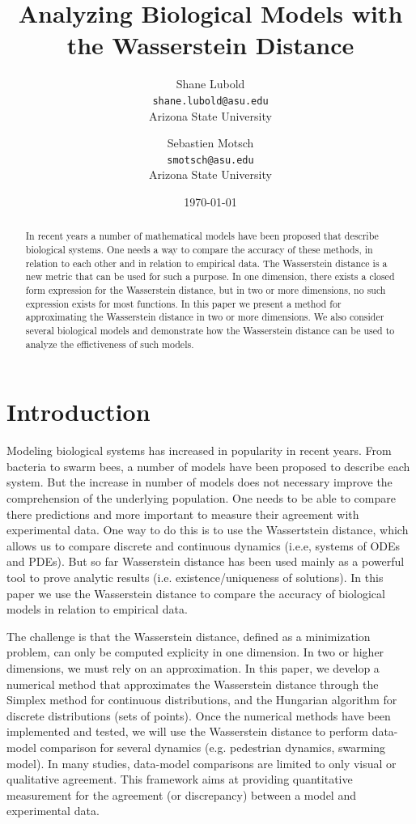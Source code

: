 \documentclass[10pt]{article}
\title{Analyzing Biological Models with the Wasserstein Distance}
\author{
  Shane Lubold\\
  \texttt{shane.lubold@asu.edu}\\
  Arizona State University
  \and
  Sebastien Motsch \\
  \texttt{smotsch@asu.edu}\\
  Arizona State University
}
\date{\today}
\begin{document}
\maketitle


\begin{abstract}
In recent years a number of mathematical models have been proposed that describe biological systems. One needs a way to compare the accuracy of these methods, in relation to each other and in relation to empirical data. The Wasserstein distance is a new metric that can be used for such a purpose. In one dimension, there exists a closed form expression for the Wasserstein distance, but in two or more dimensions, no such expression exists for most functions. In this paper we present a method for approximating the Wasserstein distance in two or more dimensions. We also consider several biological models and demonstrate how the Wasserstein distance can be used to analyze the effictiveness of such models.
\end{abstract}

\section{Introduction}

  Modeling biological systems has increased in popularity in recent years. From bacteria to swarm bees, a number of models have been proposed to describe each system. But the increase in number of models does not necessary improve the comprehension of the underlying population. One needs to be able to compare there predictions and more important to measure their agreement with experimental data. One way to do this is to use the Wassertstein distance, which allows us to compare discrete and continuous dynamics (i.e.e, systems of ODEs and PDEs). But so far Wasserstein distance has been used mainly as a powerful tool to prove analytic results (i.e. existence/uniqueness of solutions). In this paper we use the Wasserstein distance to compare the accuracy of biological models in relation to empirical data. 


The challenge is that the Wasserstein distance, defined as a minimization problem,
can only be computed explicity in one dimension. In two or higher dimensions, we must rely on an approximation. In this paper, we develop a numerical method that approximates the Wasserstein distance through the Simplex method for continuous distributions, and the Hungarian algorithm for discrete distributions (sets of points). Once the numerical methods have been implemented and tested, we will use the Wasserstein distance to perform data-model comparison for several dynamics (e.g. pedestrian dynamics, swarming model). In many studies, data-model comparisons are limited to only visual or qualitative agreement. This framework aims at providing quantitative measurement for the agreement (or discrepancy) between a model and experimental data.
\end{document}
